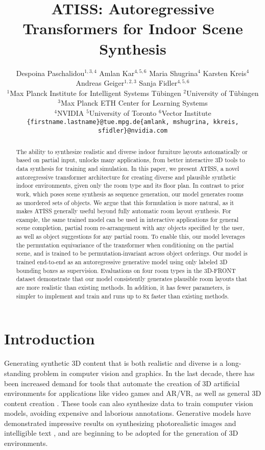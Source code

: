 \documentclass{article}
\title{ATISS: Autoregressive Transformers for Indoor Scene Synthesis}
\author{Despoina Paschalidou$^{1,3,4}$ \quad Amlan Kar$^{4,5,6}$ \quad Maria Shugrina$^{4}$ \quad Karsten Kreis$^{4}$ \\[-1em]
  \And Andreas Geiger$^{1,2,3}$ \quad Sanja Fidler$^{4,5,6}$\\[1em]
  $^1$Max Planck Institute for Intelligent Systems T{\"u}bingen\quad
  $^2$University of T{\"u}bingen\\
  $^3$Max Planck ETH Center for Learning Systems\\
  $^4$NVIDIA\quad
  $^5$University of Toronto\quad
  $^6$Vector Institute \\
  {\tt\small \{firstname.lastname\}@tue.mpg.de\quad \{amlank, mshugrina, kkreis, sfidler\}@nvidia.com}
                                            }
\begin{document}
\maketitle

\begin{abstract}
The ability to synthesize realistic and diverse indoor furniture layouts
automatically or based on partial input, unlocks many applications, from better
interactive 3D tools to data synthesis for training and simulation. In this
paper, we present ATISS, a novel autoregressive transformer architecture for
creating diverse and plausible synthetic indoor environments, given only the
room type and its floor plan. In contrast to prior work, which poses scene
synthesis as sequence generation, our model generates rooms as unordered sets
of objects. We argue that this formulation is more natural, as it makes ATISS
generally useful beyond fully automatic room layout synthesis. For example, the
same trained model can be used in interactive applications for general scene
completion, partial room re-arrangement with any objects specified by the user,
as well as object suggestions for any partial room. To enable this, our model
leverages the permutation equivariance of the transformer when conditioning on
the partial scene, and is trained to be permutation-invariant across object
orderings. Our model is trained end-to-end as an autoregressive generative
model using only labeled $3$D bounding boxes as supervision. Evaluations on
four room types in the 3D-FRONT dataset demonstrate that our model consistently
generates plausible room layouts that are more realistic than existing methods.
In addition, it has fewer parameters, is simpler to implement and train and
runs up to $8$x faster than existing methods.

\end{abstract}

\vspace{-4mm}
\section{Introduction}
\label{sec:intro}
\vspace{-1mm}

Generating synthetic 3D content that is both realistic and diverse is a
long-standing problem in computer vision and graphics.  In the last decade,
there has been increased demand for tools that automate the creation of 3D
artificial environments for applications like video games and AR/VR, as well as
general 3D content creation \cite{Yu2011SIGGRAPH, Fisher2011SIGGRAPH,
Merrell2011SIGGRAPH, Chaudhuri2013UIST, Yu20216VisComputGraph}. These tools can
also synthesize data to train computer vision models, avoiding expensive and
laborious annotations. Generative models \cite{Kingma2014ICLR,
Goodfellow2014NIPS, Dinh2017ICLR, Kingma2018NIPS, Vaswani2017NIPS} have
demonstrated impressive results on synthesizing photorealistic images
\cite{Choi2018CVPR, Brock2019ICLR, Karras2019CVPR, Choi2020CVPR,
Karras2020CVPR} and intelligible text \cite{Radford2019ARXIV,
Brown2020NeurIPS}, and are beginning to be adopted for the generation of 3D
environments. 
\end{document}
